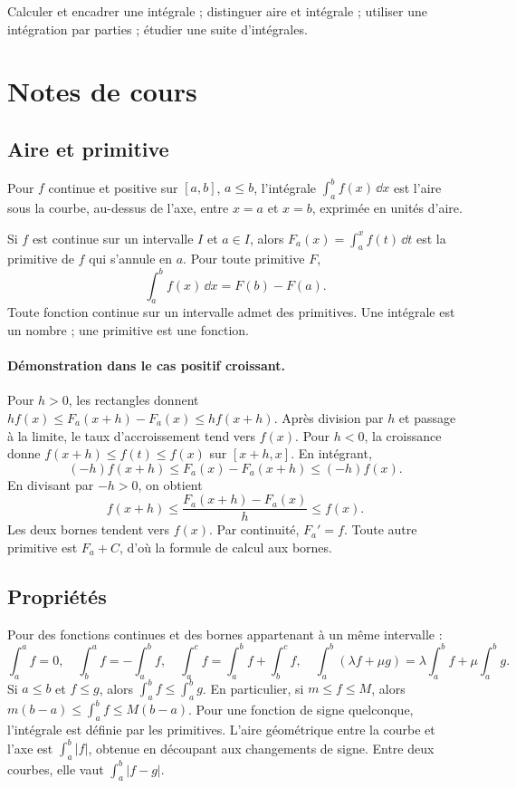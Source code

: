 \label{ch:8}


\begin{keypoint}[Objectifs]Calculer et encadrer une intégrale ; distinguer aire et intégrale ; utiliser une intégration par parties ; étudier une suite d'intégrales.\end{keypoint}

\section{Notes de cours}
\subsection{Aire et primitive}
Pour $f$ continue et positive sur $[a,b]$, $a\le b$, l'intégrale $\int_a^b f(x)\,\dd x$ est l'aire sous la courbe, au-dessus de l'axe, entre $x=a$ et $x=b$, exprimée en unités d'aire.
\begin{keypoint}
Si $f$ est continue sur un intervalle $I$ et $a\in I$, alors $F_a(x)=\int_a^x f(t)\,\dd t$ est la primitive de $f$ qui s'annule en $a$. Pour toute primitive $F$,
\[\int_a^b f(x)\,\dd x=F(b)-F(a).\]
Toute fonction continue sur un intervalle admet des primitives. Une intégrale est un nombre ; une primitive est une fonction.
\end{keypoint}
\paragraph{Démonstration dans le cas positif croissant.} Pour $h>0$, les rectangles donnent $hf(x)\le F_a(x+h)-F_a(x)\le hf(x+h)$. Après division par $h$ et passage à la limite, le taux d'accroissement tend vers $f(x)$. Pour $h<0$, la croissance donne $f(x+h)\le f(t)\le f(x)$ sur $[x+h,x]$. En intégrant,
\[(-h)f(x+h)\le F_a(x)-F_a(x+h)\le(-h)f(x).\]
En divisant par $-h>0$, on obtient
\[f(x+h)\le\frac{F_a(x+h)-F_a(x)}h\le f(x).\]
Les deux bornes tendent vers $f(x)$. Par continuité, $F_a'=f$. Toute autre primitive est $F_a+C$, d'où la formule de calcul aux bornes.
\subsection{Propriétés}
Pour des fonctions continues et des bornes appartenant à un même intervalle :
\[\int_a^a f=0,\quad\int_b^a f=-\int_a^b f,\quad
\int_a^c f=\int_a^b f+\int_b^c f,\quad
\int_a^b(\lambda f+\mu g)=\lambda\int_a^b f+\mu\int_a^b g.\]
Si $a\le b$ et $f\le g$, alors $\int_a^b f\le\int_a^b g$. En particulier, si $m\le f\le M$, alors $m(b-a)\le\int_a^b f\le M(b-a)$.
Pour une fonction de signe quelconque, l'intégrale est définie par les primitives. L'aire géométrique entre la courbe et l'axe est $\int_a^b|f|$, obtenue en découpant aux changements de signe. Entre deux courbes, elle vaut $\int_a^b|f-g|$.
